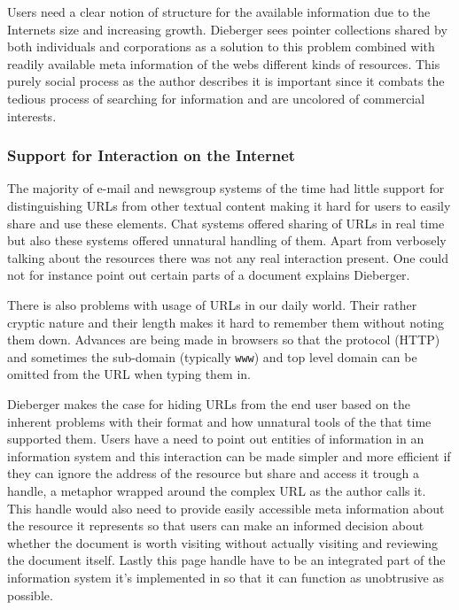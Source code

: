 \documentclass[12pt,a4paper]{article}
\begin{document}
Users need a clear notion of structure for the available information due to
the Internets size and increasing growth. Dieberger sees pointer collections
shared by both individuals and corporations as a solution to this
problem combined with readily available meta information of the webs
different kinds of resources. This purely social process as the author
describes it is important since it combats the tedious process of searching for
information and are uncolored of commercial interests.

\subsubsection{Support for Interaction on the Internet}

The majority of e-mail and newsgroup systems of the time had little support
for distinguishing URLs from other textual content making it hard for users to
easily share and use these elements. Chat systems offered sharing of URLs in
real time but also these systems offered unnatural handling of them.
Apart from verbosely talking about the resources there was not any real
interaction present. One could not for instance point out certain parts of a
document explains Dieberger.

There is also problems with usage of URLs in our daily world. Their rather
cryptic nature and their length makes it hard to remember them without noting
them down. Advances are being made in browsers so that the protocol (HTTP)
and sometimes the sub-domain (typically \texttt{www}) and top level domain can
be omitted from the URL when typing them in.

Dieberger makes the case for hiding URLs from the end user based on the
inherent problems with their format and how unnatural tools of the that time
supported them. Users have a need to point out entities of information in an
information system and this interaction can be made simpler and more efficient
if they can ignore the address of the resource but share and access it trough
a handle, a metaphor wrapped around the complex URL as the author calls it.
This handle would also need to provide easily accessible meta information
about the resource it represents so that users can make an informed decision
about whether the document is worth visiting without actually visiting and
reviewing the document itself. Lastly this page handle have to be an
integrated part of the information system it's implemented in so that it
can function as unobtrusive as possible.
\end{document}
